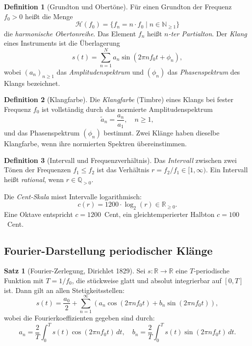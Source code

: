 ﻿\documentclass[a4paper,12pt]{article}
\theoremstyle{definition}
\newtheorem{definition}{Definition}
\newtheorem{satz}{Satz}
\begin{document}
\begin{definition}[Grundton und Obertöne]
Für einen Grundton der Frequenz $f_0 > 0$ heißt die Menge
\[
\mathcal{H}(f_0) = \{f_n = n \cdot f_0 \mid n \in \mathbb{N}_{\geq 1}\}
\]
die \emph{harmonische Obertonreihe}. Das Element $f_n$ heißt \emph{$n$-ter Partialton}.
Der \emph{Klang} eines Instruments ist die Überlagerung
\[
s(t) = \sum_{n=1}^{N} a_n \sin(2\pi n f_0 t + \phi_n),
\]
wobei $(a_n)_{n \geq 1}$ das \emph{Amplitudenspektrum} und $(\phi_n)$ das
\emph{Phasenspektrum} des Klangs bezeichnet.
\end{definition}

\begin{definition}[Klangfarbe]
Die \emph{Klangfarbe} (Timbre) eines Klangs bei fester Frequenz $f_0$ ist
vollständig durch das normierte Amplitudenspektrum
\[
\tilde{a}_n = \frac{a_n}{a_1}, \quad n \geq 1,
\]
und das Phasenspektrum $(\phi_n)$ bestimmt. Zwei Klänge haben dieselbe Klangfarbe,
wenn ihre normierten Spektren übereinstimmen.
\end{definition}

\begin{definition}[Intervall und Frequenzverhältnis]
Das \emph{Intervall} zwischen zwei Tönen der Frequenzen $f_1 \leq f_2$ ist das
Verhältnis $r = f_2/f_1 \in [1, \infty)$. Ein Intervall heißt \emph{rational},
wenn $r \in \mathbb{Q}_{>0}$.

Die \emph{Cent-Skala} misst Intervalle logarithmisch:
\[
c(r) = 1200 \cdot \log_2(r) \in \mathbb{R}_{\geq 0}.
\]
Eine Oktave entspricht $c = 1200$~Cent, ein gleichtemperierter Halbton $c = 100$~Cent.
\end{definition}

\subsection{Fourier-Darstellung periodischer Klänge}

\begin{satz}[Fourier-Zerlegung, Dirichlet 1829]
\label{satz:fourier}
Sei $s: \mathbb{R} \to \mathbb{R}$ eine $T$-periodische Funktion mit
$T = 1/f_0$, die stückweise glatt und absolut integrierbar auf $[0, T]$ ist.
Dann gilt an allen Stetigkeitsstellen:
\[
s(t) = \frac{a_0}{2} + \sum_{n=1}^{\infty} \left(a_n \cos(2\pi n f_0 t)
+ b_n \sin(2\pi n f_0 t)\right),
\]
wobei die Fourierkoeffizienten gegeben sind durch:
\[
a_n = \frac{2}{T}\int_0^T s(t)\cos(2\pi n f_0 t)\,dt, \quad
b_n = \frac{2}{T}\int_0^T s(t)\sin(2\pi n f_0 t)\,dt.
\]
\end{satz}
\end{document}
